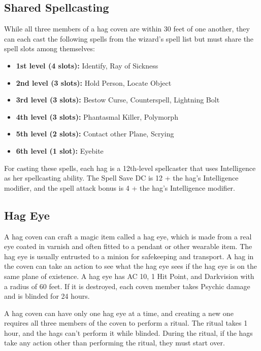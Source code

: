 \subsection*{Shared Spellcasting}
{\entryfont While all three members of a hag coven are within 30 feet of one another, they can each cast the following spells from the wizard's spell list but must share the spell slots among themselves:
\begin{itemize}
	\item[] \textbf{1st level (4 slots):} Identify, Ray of Sickness
	\item[] \textbf{2nd level (3 slots):} Hold Person, Locate Object
	\item[] \textbf{3rd level (3 slots):} Bestow Curse, Counterspell, Lightning Bolt
	\item[] \textbf{4th level (3 slots):} Phantasmal Killer, Polymorph
	\item[] \textbf{5th level (2 slots):} Contact other Plane, Scrying
	\item[] \textbf{6th level (1 slot):} Eyebite
\end{itemize}
\noindent For casting these spells, each hag is a 12th-level spellcaster that uses Intelligence as her spellcasting ability. The Spell Save DC is 12 + the hag's Intelligence modifier, and the spell attack bonus is 4 + the hag's Intelligence modifier.}

\subsection*{Hag Eye}
{\entryfont A hag coven can craft a magic item called a hag eye, which is made from a real eye coated in varnish and often fitted to a pendant or other wearable item. The hag eye is usually entrusted to a minion for safekeeping and transport. A hag in the coven can take an action to see what the hag eye sees if the hag eye is on the same plane of existence. A hag eye has AC 10, 1 Hit Point, and Darkvision with a radius of 60 feet. If it is destroyed, each coven member takes  Psychic damage and is blinded for 24 hours.

A hag coven can have only one hag eye at a time, and creating a new one requires all three members of the coven to perform a ritual. The ritual takes 1 hour, and the hags can't perform it while blinded. During the ritual, if the hags take any action other than performing the ritual, they must start over.}
\clearpage

\clearpage

\vfill\eject

\vfill\eject

\vfill\eject



